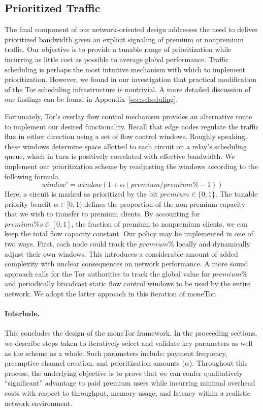 \subsection{Prioritized Traffic}
\label{subsub:prioritized}

The final component of our network-oriented design addresses the need to deliver
prioritized bandwidth given an explicit signaling of premium or nonpremium
traffic. Our objective is to provide a tunable range of prioritization while
incurring as little cost as possible to average global performance. Traffic
scheduling is perhaps the most intuitive mechanism with which to implement
prioritization. However, we found in our investigation that practical
modification of the Tor scheduling infrastructure is nontrivial. A more detailed
discussion of our findings can be found in Appendix~\ref{sec:scheduling}.

Fortunately, Tor's overlay flow control mechanism provides an alternative route
to implement our desired functionality. Recall that edge nodes regulate the
traffic flux in either direction using a set of flow control windows. Roughly
speaking, these windows determine space allotted to each circuit on a relay's
scheduling queue, which in turn is positively correlated with effective
bandwidth. We implement our prioritization scheme by readjusting the windows
according to the following formula.
\begin{equation}
  window' = window(1+ \alpha(premium / premium\% - 1))
  \label{eq:flow}
\end{equation}
Here, a circuit is marked as prioritized by the bit
$premium \in \{0, 1\}$. The tunable priority benefit
$\alpha \in [0, 1)$ defines the proportion of the non-premium capacity that we wish
to transfer to premium clients. By accounting for
$premium\%s \in [0,1]$, the fraction of premium to nonpremium clients, we
can keep the total flow capacity constant. Our policy may be
implemented in one of two ways. First, each node could track the
$premium\%$ locally and dynamically adjust their own windows. This
introduces a considerable amount of added complexity with unclear
consequences on network performance. A more sound approach calls for
the Tor authorities to track the global value for $premium\%$ and
periodically broadcast static flow control windows to be used by the
entire network. We adopt the latter approach in this iteration of
moneTor.

\paragraph*{Interlude.} This concludes the design of the moneTor framework. In
the proceeding sections, we describe steps taken to iteratively select and
validate key parameters as well as the scheme as a whole. Such parameters
include: payment frequency, preemptive channel creation, and prioritization
amounts ($\alpha$). Throughout this process, the underlying objective is to
prove that we can confer qualitatively ``significant'' advantage to paid premium
users while incurring minimal overhead costs with respect to throughput, memory
usage, and latency within a realistic network environment.

